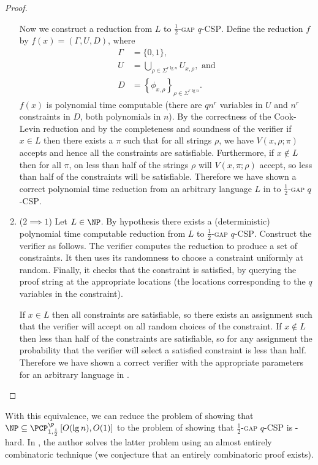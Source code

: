 \documentclass[]{article}
\newcommand{\PCPcs}[5]{\PCP^{#1}_{#2, #3}\left[#4, #5\right]}
\begin{document}
\begin{proof}
\begin{enumerate}
    Now we construct a reduction from $L$ to \textsc{$\frac{1}{2}$-gap $q$-CSP}.
    Define the reduction $f$ by $f(x) = (\Gamma, U, D)$, where
    \begin{align*}
      \Gamma & = \{0, 1\}, \\
      U & = \bigcup_{\rho \in \Sigma^{r \lg n}}{U_{x, \rho}}, \text{ and} \\
      D & = \left\{\phi_{x, \rho}\right\}_{\rho \in \Sigma^{r \lg n}}.
    \end{align*}
    $f(x)$ is polynomial time computable (there are $qn^r$ variables in $U$ and $n^r$ constraints in $D$, both polynomials in $n$).
    By the correctness of the Cook-Levin reduction and by the completeness and soundness of the \PCP{} verifier if $x \in L$ then there exists a $\pi$ such that for all strings $\rho$, we have $V(x, \rho; \pi)$ accepts and hence all the constraints are satisfiable.
    Furthermore, if $x \notin L$ then for all $\pi$, on less than half of the strings $\rho$ will $V(x, \pi; \rho)$ accept, so less than half of the constraints will be satisfiable.
    Therefore we have shown a correct polynomial time reduction from an arbitrary language $L$ in \NP{} to \textsc{$\frac{1}{2}$-gap $q$-CSP}.
  \item ($2 \implies 1$)
    Let $L \in \NP$.
    By hypothesis there exists a (deterministic) polynomial time computable reduction from $L$ to \textsc{$\frac{1}{2}$-gap $q$-CSP}.
    Construct the \PCP{} verifier as follows.
    The verifier computes the reduction to produce a set of constraints.
    It then uses its randomness to choose a constraint uniformly at random.
    Finally, it checks that the constraint is satisfied, by querying the proof string at the appropriate locations (the locations corresponding to the $q$ variables in the constraint).

    If $x \in L$ then all constraints are satisfiable, so there exists an assignment such that the verifier will accept on all random choices of the constraint.
    If $x \notin L$ then less than half of the constraints are satisfiable, so for any assignment the probability that the verifier will select a satisfied constraint is less than half.
    Therefore we have shown a correct \PCP{} verifier with the appropriate parameters for an arbitrary language in \NP.
  \end{enumerate}
\end{proof}
With this equivalence, we can reduce the problem of showing that $\NP \subseteq \PCPcs{\P}{1}{\frac{1}{2}}{O(\lg n)}{O(1)}$ to the problem of showing that \textsc{$\frac{1}{2}$-gap $q$-CSP} is \NP-hard.
In \cite{dinur07}, the author solves the latter problem using an almost entirely combinatoric technique (we conjecture that an entirely combinatoric proof exists).
\end{document}
